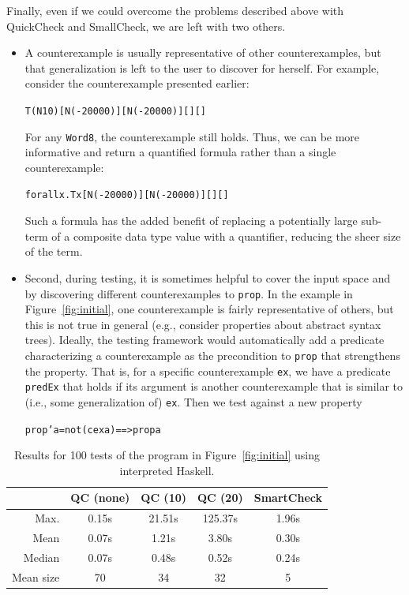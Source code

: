 \documentclass[10pt]{sigplanconf}
\newenvironment{code}{\begin{alltt}\small}{\end{alltt}}
\newcommand{\ttp}[1]{\texttt{#1}}
\begin{document}
Finally, even if we could overcome the problems described above with QuickCheck
and SmallCheck, we are left with two others.
\begin{itemize}
  \item A counterexample is usually representative of other counterexamples, but
    that generalization is left to the user to discover for herself.  For
    example, consider the counterexample presented earlier:
%
\begin{code}
T (N 10) [N (-20000)] [N (-20000)] [] []
\end{code}
%
\noindent
For any \ttp{Word8}, the counterexample still holds.  Thus, we can be more
informative and return a quantified formula rather than a single counterexample:
%
\begin{code}
forall x . T x [N (-20000)] [N (-20000)] [] []
\end{code}
%
\noindent
Such a formula has the added benefit of replacing a potentially large sub-term
of a composite data type value with a quantifier, reducing the sheer size of the term.

  \item Second, during testing, it is sometimes helpful to cover the input space
    and by discovering different counterexamples to \ttp{prop}.  In the example
    in Figure~\ref{fig:initial}, one counterexample is fairly representative of
    others, but this is not true in general (e.g., consider properties about
    abstract syntax trees).  Ideally, the testing framework would automatically
    add a predicate characterizing a counterexample as the precondition to
    \ttp{prop} that strengthens the property.  That is, for a specific
    counterexample \ttp{ex}, we have a predicate \ttp{predEx} that holds if its
    argument is another counterexample that is similar to (i.e., some
    generalization of) \ttp{ex}.  Then we test against a new property
%
\begin{code}
prop' a = not (cex a) ==> prop a
\end{code}
%
\end{itemize}

\begin{table}[ht]
\footnotesize
  \begin{center}
    \begin{tabular}{|r||c|c|c|c|}
\hline
 & QC (none) & QC (10) & QC (20) & SmartCheck \\
\hline \hline
Max.  & 0.15s & 21.51s & 125.37s & 1.96s\\
\hline
Mean  & 0.07s & 1.21s & 3.80s & 0.30s\\
\hline
Median & 0.07s & 0.48s & 0.52s & 0.24s\\
\hline
Mean size & 70 & 34 & 32 & 5\\
\hline
    \end{tabular}
  \end{center}
  \caption{Results for 100 tests of the program in Figure~\ref{fig:initial}
    using interpreted Haskell.}
  \label{table:results}
\end{table}
\end{document}
